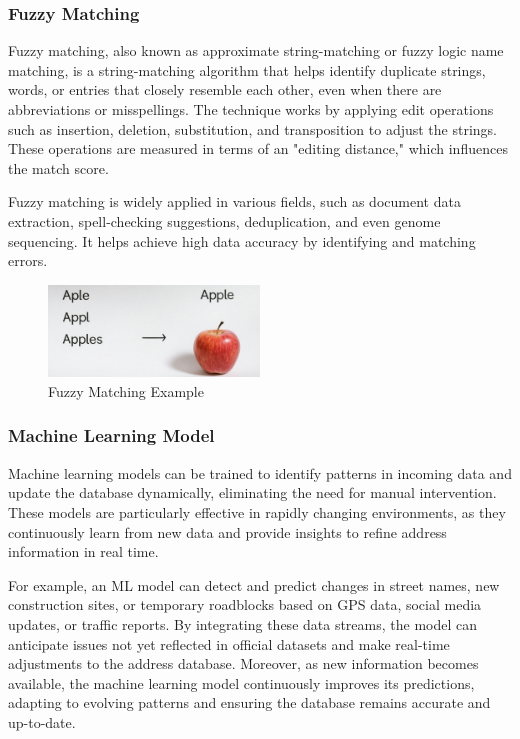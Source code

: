         \subsubsection{Fuzzy Matching}
        Fuzzy matching, also known as approximate string-matching or fuzzy logic name matching, is a string-matching algorithm that helps identify duplicate strings, words, or entries that closely resemble each other, even when there are abbreviations or misspellings. The technique works by applying edit operations such as insertion, deletion, substitution, and transposition to adjust the strings. These operations are measured in terms of an "editing distance," which influences the match score.\blankLine
        
        Fuzzy matching is widely applied in various fields, such as document data extraction, spell-checking suggestions, deduplication, and even genome sequencing. It helps achieve high data accuracy by identifying and matching errors. \autocite{Nieters2024Dec}

        \begin{figure}[H]
            \centering
            \includegraphics[width=0.5\textwidth]{images/AdminPanel/FuzzyMatching.png}
            \caption{Fuzzy Matching Example}
            \label{fig:fuzzy-matching}
        \end{figure}

        \subsubsection{Machine Learning Model}
        Machine learning models can be trained to identify patterns in incoming data and update the database dynamically, eliminating the need for manual intervention. These models are particularly effective in rapidly changing environments, as they continuously learn from new data and provide insights to refine address information in real time.\blankLine

        For example, an ML model can detect and predict changes in street names, new construction sites, or temporary roadblocks based on GPS data, social media updates, or traffic reports. By integrating these data streams, the model can anticipate issues not yet reflected in official datasets and make real-time adjustments to the address database. Moreover, as new information becomes available, the machine learning model continuously improves its predictions, adapting to evolving patterns and ensuring the database remains accurate and up-to-date. \autocite{Encora2023Nov}
        
